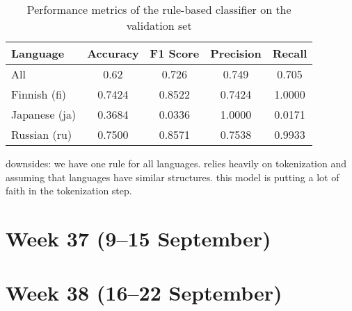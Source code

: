 \documentclass{article}
\begin{document}
\begin{enumerate}
    \begin{table}[h]
        \centering
        \begin{tabular}{|l|c|c|c|c|}
            \hline
            Language & Accuracy & F1 Score & Precision & Recall \\
            \hline
            All & 0.62 & 0.726 & 0.749 & 0.705 \\
            Finnish (fi) & 0.7424 & 0.8522 & 0.7424 & 1.0000 \\
            Japanese (ja) & 0.3684 & 0.0336 & 1.0000 & 0.0171 \\
            Russian (ru) & 0.7500 & 0.8571 & 0.7538 & 0.9933 \\
            \hline
        \end{tabular}
        \caption{Performance metrics of the rule-based classifier on the validation set}
        \label{tab:classifier_performance}
    \end{table}

    downsides:
        we have one rule for all languages. relies heavily on tokenization and assuming that languages have similar structures.
        this model is putting a lot of faith in the tokenization step.

\end{enumerate}

\section{Week 37 (9--15 September)}

\section{Week 38 (16--22 September)}
\end{document}

